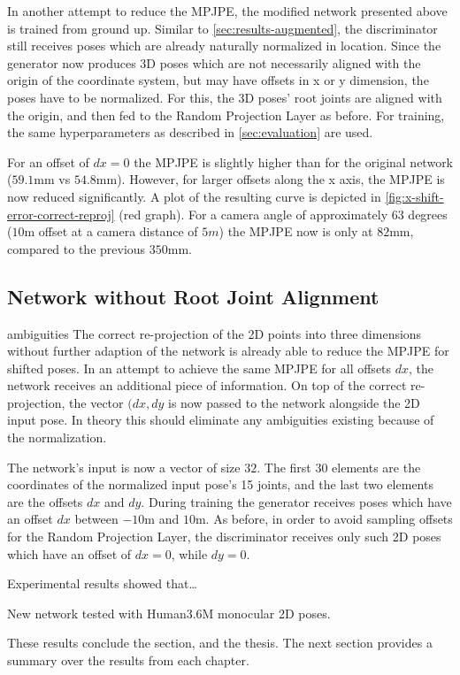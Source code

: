 In another attempt to reduce the MPJPE, the modified network presented above is trained from ground up.
Similar to \autoref{sec:results-augmented}, the discriminator still receives poses which are already naturally normalized in location.
Since the generator now produces 3D poses which are not necessarily aligned with the origin of the coordinate system, but may have offsets in x or y dimension, the poses have to be normalized.
For this, the 3D poses' root joints are aligned with the origin, and then fed to the Random Projection Layer as before.
For training, the same hyperparameters as described in \autoref{sec:evaluation} are used.

For an offset of $dx = 0$ the MPJPE is slightly higher than for the original network ($59.1$mm vs $54.8$mm).
However, for larger offsets along the x axis, the MPJPE is now reduced significantly.
A plot of the resulting curve is depicted in \autoref{fig:x-shift-error-correct-reproj} (red graph).
For a camera angle of approximately $63$ degrees ($10$m offset at a camera distance of $5m$) the MPJPE now is only at $82$mm, compared to the previous $350$mm.




\subsection{Network without Root Joint Alignment}
ambiguities
The correct re-projection of the 2D points into three dimensions without further adaption of the network is already able to reduce the MPJPE for shifted poses.
In an attempt to achieve the same MPJPE for all offsets $dx$, the network receives an additional piece of information.
On top of the correct re-projection, the vector $(dx, dy$ is now passed to the network alongside the 2D input pose.
In theory this should eliminate any ambiguities existing because of the normalization.

The network's input is now a vector of size $32$. 
The first $30$ elements are the coordinates of the normalized input pose's 15 joints, and the last two elements are the offsets $dx$ and $dy$.
During training the generator receives poses which have an offset $dx$ between $-10$m and $10$m.
As before, in order to avoid sampling offsets for the Random Projection Layer, the discriminator receives only such 2D poses which have an offset of $dx = 0$, while $dy = 0$.

Experimental results showed that\dots

New network tested with Human3.6M monocular 2D poses.



These results conclude the section, and the thesis.
The next section provides a summary over the results from each chapter.
